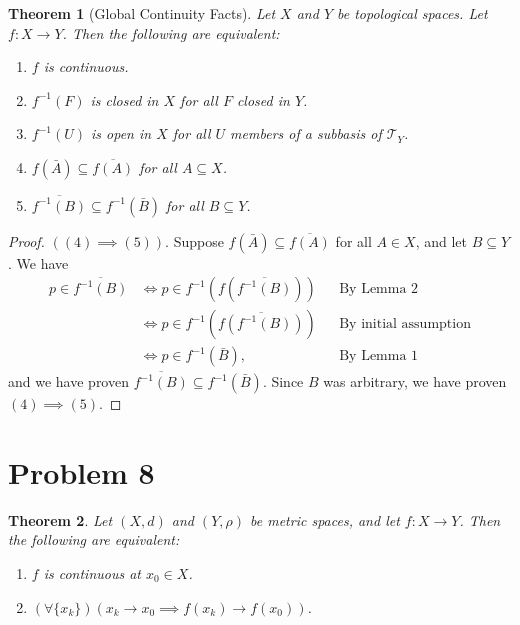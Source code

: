 \documentclass[10pt,a4paper]{article}
\theoremstyle{theorem}
\newtheorem{theorem}{Theorem}
\theoremstyle{definition}
\newcommand{\Tau}{\mathcal{T}}
\begin{document}
\begin{theorem}[Global Continuity Facts]
Let $X$ and $Y$ be topological spaces. Let $f:X \to Y$. Then the following are equivalent:
\begin{enumerate}
\item $f$ is continuous.
\item $f^{-1}(F)$ is closed in $X$ for all $F$ closed in $Y$.
\item $f^{-1}(U)$ is open in $X$ for all $U$ members of a subbasis of $\Tau_Y$.
\item $f(\bar{A}) \subseteq \overline{f(A)}$ for all $A \subseteq X$.
\item $\overline{f^{-1}(B)} \subseteq f^{-1}(\bar{B})$ for all $B \subseteq Y$.
\end{enumerate}
\end{theorem}

\begin{proof}$((4) \implies (5))$.  Suppose $f(\bar{A}) \subseteq \overline{f(A)}$ for all $A \in X$, and let $B \subseteq Y$. We have
\begin{align*}
p \in \overline{f^{-1}(B)} &\iff p \in f^{-1}(f(\overline{f^{-1}(B)})) && \text{By Lemma 2}\\
&\iff p \in f^{-1}(\overline{f(f^{-1}(B))}) && \text{By initial assumption}\\
&\iff p \in f^{-1}(\bar{B}), &&\text{By Lemma 1}
\end{align*}
and we have proven $\overline{f^{-1}(B)} \subseteq f^{-1}(\bar{B})$. Since $B$ was arbitrary, we have proven $(4) \implies (5)$.
\end{proof}

\section*{Problem 8}
\begin{theorem}
Let $(X, d)$ and $(Y, \rho)$ be metric spaces, and let $f : X \to Y$. Then the following are equivalent:
\begin{enumerate}
\item $f$ is continuous at $x_0 \in X$.
\item $(\forall \{x_k\})(x_k \to x_0 \implies f(x_k) \to f(x_0))$.
\end{enumerate}
\end{theorem}
\end{document}
